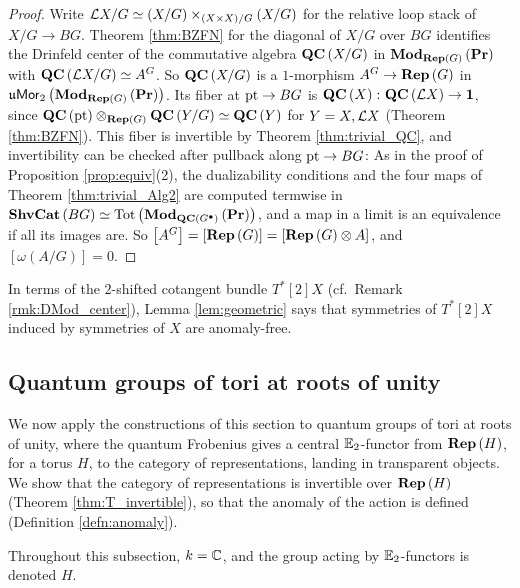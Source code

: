 \begin{proof}
Write $\mathcal{L} X/G\simeq\left(X/G\right)\times_{\left(X\times X\right)/G}\left(X/G\right)$ for the
relative loop stack of $X/G\to BG$. Theorem \ref{thm:BZFN} for the diagonal of $X/G$ over $BG$
identifies the Drinfeld center of the commutative algebra $\mathbf{QC}\left(X/G\right)$ in
$\mathbf{Mod}_{\mathbf{Rep}\left(G\right)}\left(\mathbf{Pr}\right)$ with $\mathbf{QC}\left(\mathcal{L} X/G\right)\simeq A^G$. So
$\mathbf{QC}\left(X/G\right)$ is a $1$-morphism $A^G\to\mathbf{Rep}\left(G\right)$ in
$\mathfrak{u}\mathsf{Mor}_2\left(\mathbf{Mod}_{\mathbf{Rep}\left(G\right)}\left(\mathbf{Pr}\right)\right)$. Its fiber at $\text{pt}\to BG$ is
$\mathbf{QC}\left(X\right)\colon\mathbf{QC}\left(\mathcal{L} X\right)\to\mathbf{1}$, since
$\mathbf{QC}\left(\text{pt}\right)\otimes_{\mathbf{Rep}\left(G\right)}\mathbf{QC}\left(Y/G\right)\simeq\mathbf{QC}\left(Y\right)$ for
$Y=X,\mathcal{L} X$ (Theorem \ref{thm:BZFN}). This fiber is invertible by Theorem \ref{thm:trivial_QC},
and invertibility can be checked after pullback along $\text{pt}\to BG$: As in the proof of
Proposition \ref{prop:equiv}(2), the dualizability conditions and the four maps of Theorem
\ref{thm:trivial_Alg2} are computed termwise in
$\mathbf{ShvCat}\left(BG\right)\simeq\mathrm{Tot}\left(\mathbf{Mod}_{\mathbf{QC}\left(G^\bullet\right)}\left(\mathbf{Pr}\right)\right)$,
and a map in a limit is an equivalence if all its images are. So $\left[A^G\right]=\left[\mathbf{Rep}\left(G\right)\right]=\left[\mathbf{Rep}\left(G\right)\otimes A\right]$,
and $\left[\omega\left(A/G\right)\right]=0$.
\end{proof}

In terms of the $2$-shifted cotangent bundle $T^*\left[2\right]X$ (cf.\ Remark
\ref{rmk:DMod_center}), Lemma \ref{lem:geometric} says that symmetries of $T^*\left[2\right]X$
induced by symmetries of $X$ are anomaly-free.

\subsection{Quantum groups of tori at roots of unity}
\label{sec:detect}

We now apply the constructions of this section to quantum groups of tori at roots of unity, where
the quantum Frobenius gives a central $\mathbb{E}_2$-functor from $\mathbf{Rep}\left(H\right)$, for a torus $H$, to
the category of representations, landing in transparent objects. We show that the category of
representations is invertible over $\mathbf{Rep}\left(H\right)$ (Theorem \ref{thm:T_invertible}), so that
the anomaly of the action is defined (Definition \ref{defn:anomaly}).

Throughout this subsection, $k=\mathbb{C}$, and the group acting by $\mathbb{E}_2$-functors is denoted $H$.

